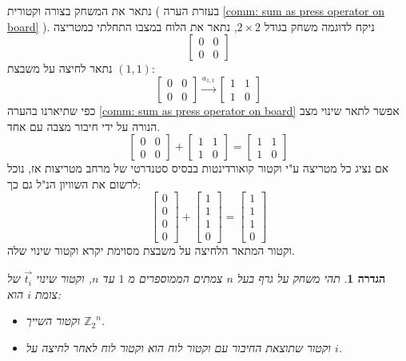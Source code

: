 \documentclass[12pt,leqno]{article}
\theoremstyle{theoremdd}
\newtheorem{definition}{הגדרה}[section]
\newcommand{\Zn}{{\mathbb{Z}_2}^n}
\begin{document}
נתאר את המשחק 
בצורה וקטורית
(
בעזרת הערה 
\ref{comm: sum as press operator on board}
).
ניקח לדוגמה
משחק בגודל
$2 \times 2$,
נתאר את הלוח במצבו התחלתי כמטריצה
\[\begin{bmatrix}
0 & 0 \\
0 & 0 
\end{bmatrix}\]
נתאר לחיצה על משבצת 
$(1,1)$:
\[ 
    \begin{bmatrix}
    0 & 0 \\
    0 & 0 
    \end{bmatrix} \stackrel{a_{1,1}}{\longrightarrow}
    \begin{bmatrix}
    1 & 1 \\
    1 & 0 
    \end{bmatrix}
 \]
 כפי שתיארנו 
 בהערה 
 \ref{comm: sum as press operator on board}
 אפשר לתאר שינוי מצב הנורה על ידי חיבור 
 מצבה
 עם אחד.
\[
    \begin{bmatrix}
    0 & 0 \\
    0 & 0 
    \end{bmatrix} + 
    \begin{bmatrix}
    1 & 1 \\
    1 & 0 
    \end{bmatrix}=
    \begin{bmatrix}
    1 & 1 \\
    1 & 0 
    \end{bmatrix} 
\]  
אם נציג כל מטריצה ע"י וקטור קואורדינטות
בבסיס סטנדרטי של מרחב מטריצות
אז, נוכל לרשום את השוויון הנ"ל גם כך:
 \[ 
    \begin{bmatrix} 
    0 \\ 0 \\ 0 \\ 0
    \end{bmatrix} +  \begin{bmatrix} 
    1 \\ 1 \\ 1 \\ 0
    \end{bmatrix} =  \begin{bmatrix} 
    1 \\ 1 \\ 1 \\ 0
    \end{bmatrix}  
 \]
וקטור המתאר הלחיצה
על משבצת מסוימת יקרא וקטור שינוי שלה.
 \begin{definition}
    \label{def:chang-vector}
    תהי 
    משחק על גרף בעל
    $n$
    צמתים
    הממוספרים מ
    $1$
    עד
    $n$,
    וקטור שינוי
    $\vec{t_i}$
    של צומת  
    $i$
    הוא:
    \begin{itemize}
        \item 
            וקטור 
            השייך 
            $\Zn$.
        \item 
            וקטור שתוצאת החיבור עם וקטור לוח 
            הוא וקטור לוח לאחר לחיצה על 
            $i$.
    \end{itemize}
\end{definition}
\end{document}
